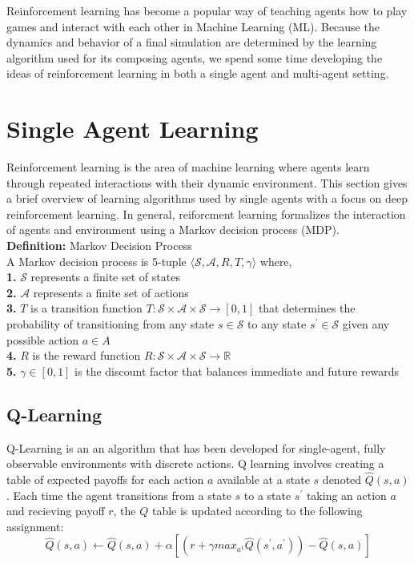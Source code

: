 \documentclass[12pt,twoside]{reedthesis}
\begin{document}
Reinforcement learning has become a popular way of teaching agents how to play games and interact with each other in Machine Learning (ML). Because the dynamics and behavior of a final simulation are determined by the learning algorithm used for its composing agents, we spend some time developing the ideas of reinforcement learning in both a single agent and multi-agent setting. 
\section{Single Agent Learning}
	Reinforcement learning is the area of machine learning where agents learn through repeated interactions with their dynamic environment. This section gives a brief overview of learning algorithms used by single agents with a focus on deep reinforcement learning. In general, reiforcment learning formalizes the interaction of agents and environment using a Markov decision process (MDP).\\
	
	\textbf{Definition:} Markov Decision Process \\
	A Markov decision process is 5-tuple $ \langle \mathcal{S, A,} R, T, \gamma \rangle $ where, \\
	\textbf{1.} $\mathcal{S}$ represents a finite set of states \\
	\textbf{2.} $\mathcal{A}$ represents a finite set of actions \\
	\textbf{3.} $T$ is a transition function $T: \mathcal{S} \times \mathcal{A} \times \mathcal{S} \rightarrow [0,1]$ that determines the probability of transitioning from any state $s \in \mathcal{S}$ to any state $s^{'} \in \mathcal{S}$ given any possible action $a \in A$\\
	\textbf{4.} $R$ is the reward function $R: \mathcal{S} \times \mathcal{A} \times \mathcal{S} \rightarrow \mathbb{R}$\\
	\textbf{5.} $\gamma \in [0,1]$ is the discount factor that balances immediate and future rewards
	
	
\subsection{Q-Learning}
Q-Learning is an an algorithm that has been developed for single-agent, fully observable environments with discrete actions. Q learning involves creating a table of expected payoffs for each action $a$ available at a state $s$ denoted $\hat{Q}(s,a)$. Each time the agent transitions from a state $s$ to a state $s^{'}$ taking an action $a$ and recieving payoff $r$, the $Q$ table is updated according to the following assignment:
$$ \hat{Q}(s,a) \leftarrow \hat{Q}(s,a) + \alpha [(r + \gamma max_{a^{1}} \hat{Q}(s^{'}, a^{'})) - \hat{Q}(s,a)] $$
\end{document}
